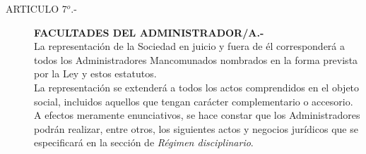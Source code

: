 \documentclass[11pt,letterpaper]{report}
\begin{document}
\begin{itemize}
\begin{description}
\item[ARTICULO 7$^{o}$.-] {\bf FACULTADES DEL ADMINISTRADOR/A.-}\\ La representaci\'on de la Sociedad en juicio y fuera de \'el corresponder\'a a todos los Administradores Mancomunados nombrados en la forma prevista por la Ley y estos estatutos.\\
La representaci\'on se extender\'a a todos los actos comprendidos en el objeto social, incluidos aquellos que tengan car\'acter complementario o accesorio.\\
A efectos meramente enunciativos, se hace constar que los Administradores podr\'an realizar, entre otros, los siguientes actos y negocios jur\'idicos que se especificar\'a en la secci\'on de {\it R\'egimen disciplinario}.

\end{description}

\end{itemize}
\end{document}
